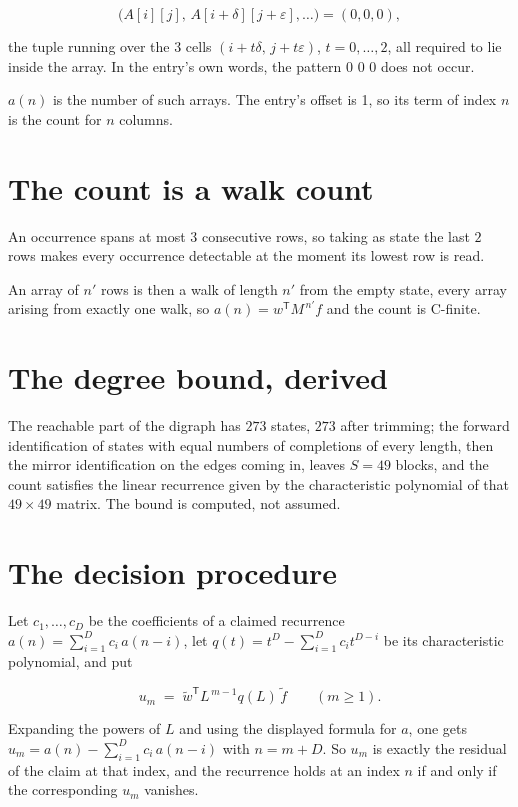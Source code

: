 \documentclass[11pt]{article}
\theoremstyle{definition}
\begin{document}
\[\bigl(A[i][j],\,A[i{+}\delta][j{+}\varepsilon],\dots\bigr) = (0, 0, 0),\]

the tuple running over the $3$ cells $(i+t\delta,\,j+t\varepsilon)$, $t = 0,\dots,2$, all required to lie inside the array. In the entry's own words, the pattern 0 0 0 does not occur.

$a(n)$ is the number of such arrays. The entry's offset is 1, so its term of index $n$ is the count for $n$ columns.

\section{The count is a walk count}

An occurrence spans at most $3$ consecutive rows, so taking as state the last $2$ rows makes every occurrence detectable at the moment its lowest row is read.

An array of $n'$ rows is then a walk of length $n'$ from the empty state, every array arising from exactly one walk, so $a(n) = w^{\mathsf T}M^{\,n'}f$ and the count is C-finite.

\section{The degree bound, derived}

The reachable part of the digraph has $273$ states, $273$ after trimming; the forward identification of states with equal numbers of completions of every length, then the mirror identification on the edges coming in, leaves $S = 49$ blocks, and the count satisfies the linear recurrence given by the characteristic polynomial of that $49\times49$ matrix. The bound is computed, not assumed.

\section{The decision procedure}

Let $c_1,\dots,c_D$ be the coefficients of a claimed recurrence $a(n) = \sum_{i=1}^{D} c_i\,a(n-i)$, let $q(t) = t^{D} - \sum_{i=1}^{D} c_i t^{D-i}$ be its characteristic polynomial, and put

\[u_m \;=\; \tilde w^{\mathsf T} L^{\,m-1} q(L)\,\tilde f \qquad (m \ge 1).\]

Expanding the powers of $L$ and using the displayed formula for $a$, one gets $u_m = a(n) - \sum_{i=1}^{D} c_i\,a(n-i)$ with $n = m + D$. So $u_m$ is exactly the residual of the claim at that index, and the recurrence holds at an index $n$ if and only if the corresponding $u_m$ vanishes.
\end{document}

